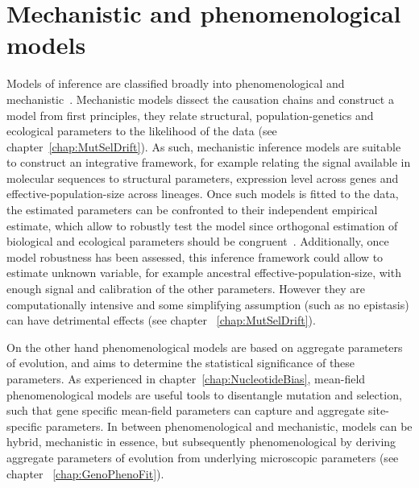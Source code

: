 \section{Mechanistic and phenomenological models}
\label{sec:mechanistic-and-phenomenological-models}

Models of inference are classified broadly into phenomenological and mechanistic~\citep{Rodrigue2010a}.
Mechanistic models dissect the causation chains and construct a model from first principles, they relate structural, population-genetics and ecological parameters to the \gls{likelihood} of the data (see chapter~\ref{chap:MutSelDrift}).
As such, mechanistic inference models are suitable to construct an integrative framework, for example relating the signal available in molecular sequences to structural parameters, expression level across genes and \gls{effective-population-size} across lineages.
Once such models is fitted to the data, the estimated parameters can be confronted to their independent empirical estimate, which allow to robustly test the model since orthogonal estimation of biological and ecological parameters should be congruent~\citep{Dasmeh2014}.
Additionally, once model robustness has been assessed, this inference framework could allow to estimate unknown variable, for example ancestral \gls{effective-population-size}, with enough signal and calibration of the other parameters.
However they are computationally intensive and some simplifying assumption (such as no epistasis) can have detrimental effects (see chapter ~\ref{chap:MutSelDrift}).

On the other hand phenomenological models are based on aggregate parameters of evolution, and aims to determine the statistical significance of these parameters.
As experienced in chapter~\ref{chap:NucleotideBias}, mean-field phenomenological models are useful tools to disentangle mutation and selection, such that gene specific mean-field parameters can capture and aggregate site-specific parameters.
In between phenomenological and mechanistic, models can be hybrid, mechanistic in essence, but subsequently phenomenological by deriving aggregate parameters of evolution from underlying microscopic parameters (see chapter ~\ref{chap:GenoPhenoFit}).

